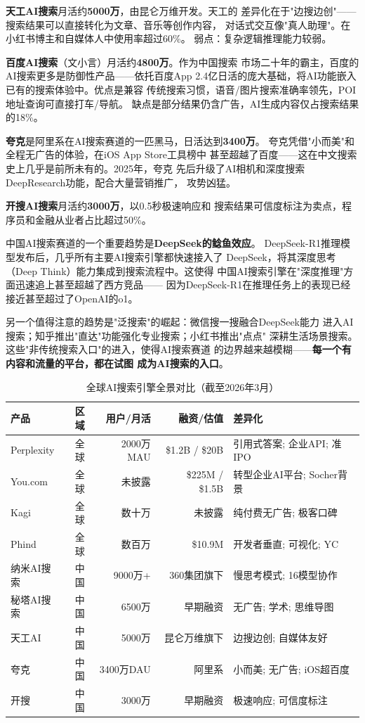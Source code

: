 \textbf{天工AI搜索}月活约\textbf{5000万}，由昆仑万维开发。天工的
差异化在于"边搜边创"——搜索结果可以直接转化为文章、音乐等创作内容，
对话式交互像"真人助理"。在小红书博主和自媒体人中使用率超过60\%。
弱点：复杂逻辑推理能力较弱。

\textbf{百度AI搜索}（文小言）月活约\textbf{4800万}。作为中国搜索
市场二十年的霸主，百度的AI搜索更多是防御性产品——依托百度App
2.4亿日活的庞大基础，将AI功能嵌入已有的搜索体验中。优点是兼容
传统搜索习惯，语音/图片搜索准确率领先，POI地址查询可直接打车/导航。
缺点是部分结果仍含广告，AI生成内容仅占搜索结果的18\%。

\textbf{夸克}是阿里系在AI搜索赛道的一匹黑马，日活达到\textbf{3400万}。
夸克凭借"小而美"和全程无广告的体验，在iOS App Store工具榜中
甚至超越了百度——这在中文搜索史上几乎是前所未有的。2025年，夸克
先后升级了AI相机和深度搜索DeepResearch功能，配合大量营销推广，
攻势凶猛。

\textbf{开搜AI搜索}月活约\textbf{3000万}，以0.5秒极速响应和
搜索结果可信度标注为卖点，程序员和金融从业者占比超过50\%。

中国AI搜索赛道的一个重要趋势是\textbf{DeepSeek的鲶鱼效应}。
DeepSeek-R1推理模型发布后，几乎所有主要AI搜索引擎都快速接入了
DeepSeek，将其深度思考（Deep Think）能力集成到搜索流程中。这使得
中国AI搜索引擎在"深度推理"方面迅速追上甚至超越了西方竞品——
因为DeepSeek-R1在推理任务上的表现已经接近甚至超过了OpenAI的o1。

另一个值得注意的趋势是"泛搜索"的崛起：微信搜一搜融合DeepSeek能力
进入AI搜索；知乎推出"直达"功能强化专业搜索；小红书推出"点点"
深耕生活场景搜索。这些"非传统搜索入口"的进入，使得AI搜索赛道
的边界越来越模糊——\textbf{每一个有内容和流量的平台，都在试图
成为AI搜索的入口}。

\begin{table}[htbp]
\centering
\caption{全球AI搜索引擎全景对比（截至2026年3月）}
\label{tab:ai-search-comparison}
\small
\begin{tabularx}{\textwidth}{l c r r X}
\toprule
\rowcolor{figLightGray}
\textbf{产品} & \textbf{区域} & \textbf{用户/月活}
  & \textbf{融资/估值} & \textbf{差异化} \\
\midrule
Perplexity  & 全球 & 2000万MAU
  & \$1.2B / \$20B & 引用式答案; 企业API; 准IPO \\
You.com     & 全球 & 未披露
  & \$225M / \$1.5B & 转型企业AI平台; Socher背景 \\
Kagi        & 全球 & 数十万
  & 未披露 & 纯付费无广告; 极客口碑 \\
Phind       & 全球 & 数百万
  & \$10.9M & 开发者垂直; 可视化; YC \\
\midrule
纳米AI搜索  & 中国 & 9000万+
  & 360集团旗下 & 慢思考模式; 16模型协作 \\
秘塔AI搜索  & 中国 & 6500万
  & 早期融资 & 无广告; 学术; 思维导图 \\
天工AI      & 中国 & 5000万
  & 昆仑万维旗下 & 边搜边创; 自媒体友好 \\
夸克        & 中国 & 3400万DAU
  & 阿里系 & 小而美; 无广告; iOS超百度 \\
开搜        & 中国 & 3000万
  & 早期融资 & 极速响应; 可信度标注 \\
\bottomrule
\end{tabularx}
\end{table}

